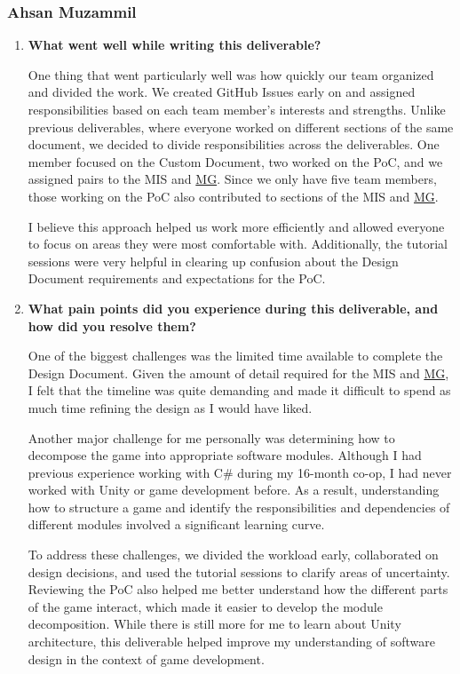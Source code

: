 \documentclass[10pt, titlepage]{article}
\newcommand{\mgurl}{https://github.com/team-hindsight/ophthamology-game/blob/main/pdfs/Design/SoftArchitecture/MG.pdf}
\newcommand{\mg}{\href{\mgurl}{MG}}
\begin{document}
\subsubsection*{Ahsan Muzammil}

\begin{enumerate}
\item \textbf{What went well while writing this deliverable?}

One thing that went particularly well was how quickly our team
organized and divided the work. We created GitHub Issues early
on and assigned responsibilities based on each team member's
interests and strengths. Unlike previous deliverables, where
everyone worked on different sections of the same document,
we decided to divide responsibilities across the deliverables.
One member focused on the Custom Document, two worked on
the PoC, and we assigned pairs to the MIS and \mg{}. Since we
only have five team members, those working on the PoC also
contributed to sections of the MIS and \mg{}.

I believe this approach helped us work more efficiently
and allowed everyone to focus on areas they were most
comfortable with. Additionally, the tutorial sessions were
very helpful in clearing up confusion about the Design
Document requirements and expectations for the PoC.


\item \textbf{What pain points did you experience during this deliverable,
and how did you resolve them?}

One of the biggest challenges was the limited time available
to complete the Design Document. Given the amount of detail
required for the MIS and \mg{}, I felt that the timeline was
quite demanding and made it difficult to spend as much time
refining the design as I would have liked.

Another major challenge for me personally was determining
how to decompose the game into appropriate software modules.
Although I had previous experience working with C\# during
my 16-month co-op, I had never worked with Unity or game
development before. As a result, understanding how to
structure a game and identify the responsibilities and
dependencies of different modules involved a significant
learning curve.

To address these challenges, we divided the workload early,
collaborated on design decisions, and used the tutorial
sessions to clarify areas of uncertainty. Reviewing the
PoC also helped me better understand how the different
parts of the game interact, which made it easier to
develop the module decomposition. While there is still
more for me to learn about Unity architecture, this
deliverable helped improve my understanding of software
design in the context of game development.

\end{enumerate}
\end{document}
